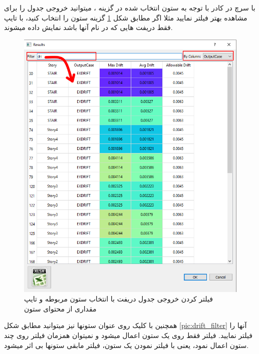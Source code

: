 با سرچ در کادر 
با توجه به ستون انتخاب شده در گزینه 
، میتوانید خروجی جدول را برای مشاهده بهتر فیلتر نمایید مثلا اگر مطابق شکل
\ref{pic:drift}
گزینه ستون را
انتخاب کنید، با تایپ 
فقط دریفت هایی که در نام آنها  باشد نمایش داده میشوند.

\begin{figure}[H]
   \centering
   \includegraphics[scale=0.7]{figures/drift}
   \caption{فیلتر کردن خروجی جدول دریفت با انتخاب ستون مربوطه و تایپ  مقداری از محتوای ستون}
   \label{pic:drift}
\end{figure}

همچنین با کلیک روی عنوان ستونها نیز میتوانید مطابق شکل 
\ref{pic:drift_filter}
 آنها را فیلتر نمایید. فیلتر فقط روی یک ستون اعمال میشود و نمیتوان همزمان فیلتر روی چند ستون اعمال نمود، یعنی با فیلتر نمودن یک ستون، فیلتر مابقی ستونها بی اثر میشود.
 
